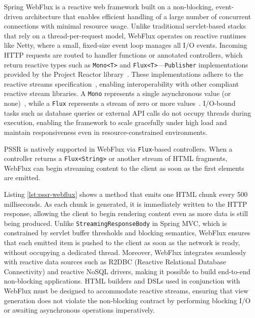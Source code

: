 \documentclass[software,article,accept,pdftex,moreauthors]{Definitions/mdpi}
\begin{document}
Spring WebFlux is a reactive web framework built on a non-blocking,
event-driven architecture that enables efficient handling of a large number of
concurrent connections with minimal resource usage. Unlike traditional
servlet-based stacks that rely on a thread-per-request model, WebFlux operates
on reactive runtimes like Netty, where a small, fixed-size event loop manages
all I/O events. Incoming HTTP requests are routed to handler functions or
annotated controllers, which return reactive types such as \texttt{Mono<T>} and
\texttt{Flux<T>}---\texttt{Publisher} implementations provided by the Project
Reactor library~\cite{projectreactor}. These implementations adhere to the
reactive streams specification~\cite{ReactiveStreams}, enabling
interoperability with other compliant reactive stream libraries. A
\texttt{Mono} represents a single asynchronous value (or none)~\cite{promise},
while a \texttt{Flux} represents a stream of zero or more
values~\cite{rx-observable}. I/O-bound tasks such as
database queries or external API calls do not occupy threads during execution,
enabling the framework to scale gracefully under high load and maintain
responsiveness even in resource-constrained environments.

PSSR is natively supported in WebFlux via \texttt{Flux}-based controllers. When
a controller returns a \texttt{Flux<String>} or another stream of HTML
fragments, WebFlux can begin streaming content to the client as soon as the
first elements are emitted.


Listing \ref{lst:pssr-webflux} shows a method that emits one HTML chunk every 500 milliseconds. As
each chunk is generated, it is immediately written to the HTTP response,
allowing the client to begin rendering content even as more data is still being
produced. Unlike \texttt{StreamingResponseBody} in Spring MVC, which is
constrained by servlet buffer thresholds and blocking semantics, WebFlux
ensures that each emitted item is pushed to the client as soon as the network
is ready, without occupying a dedicated thread. Moreover, WebFlux integrates
seamlessly with reactive data sources such as R2DBC (Reactive Relational
Database Connectivity) and reactive NoSQL drivers, making it possible to build
end-to-end non-blocking applications. HTML builders and DSLs used in
conjunction with WebFlux must be designed to accommodate reactive streams,
ensuring that view generation does not violate the non-blocking contract by
performing blocking I/O or awaiting asynchronous operations imperatively.
\end{document}
